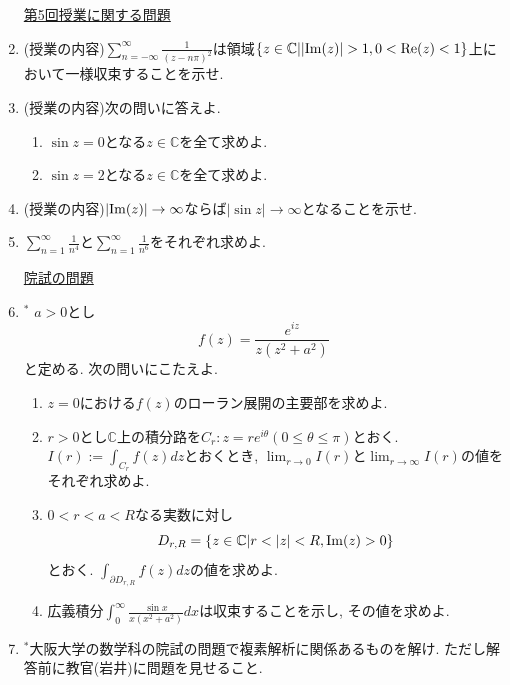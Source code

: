 \documentclass[dvipdfmx,a4paper,11pt]{article}
\newcommand{\C}{\mathbb{C}}
\theoremstyle{definition}
\begin{document}
\begin{enumerate}[label=\textbf{問}4.\arabic*]
      
 \vspace{12pt}
\hspace{-36pt}\underline{第5回授業に関する問題}     
  \item (授業の内容)$\sum_{n= - \infty}^{\infty} \frac{1}{(z - n \pi)^2}$は領域$\{ z \in \C | |{\rm Im}(z)| >1, 0 < {\rm Re}(z) < 1\}$上において一様収束することを示せ.

 \item  (授業の内容)次の問いに答えよ.
  \begin{enumerate}
\setlength{\parskip}{0cm} 
  \setlength{\itemsep}{0cm} 
\item $\sin z =0$となる$z \in \C$を全て求めよ. 
\item $\sin z =2$となる$z \in \C$を全て求めよ. 
   \end{enumerate}
   
 \item  (授業の内容)$|{ \rm Im}(z)| \rightarrow \infty$ならば$|\sin z| \rightarrow \infty$となることを示せ.
 
 
\item $\sum_{n=1}^{\infty}\frac{1}{n^4}$と$\sum_{n=1}^{\infty}\frac{1}{n^6}$をそれぞれ求めよ. 

   
 
\vspace{12pt}
\hspace{-36pt}\underline{院試の問題}  
  \item $^{*}$ $a>0$とし
  $$
  f(z) = \frac{ e^{iz}}{z(z^2 + a^2)}
  $$
  と定める. 次の問いにこたえよ.
   \begin{enumerate}
 \setlength{\parskip}{0cm} 
  \setlength{\itemsep}{0cm} 
  \item $z=0$における$f(z)$のローラン展開の主要部を求めよ.
  \item $r>0$とし$\C$上の積分路を$C_{r} : z = r e^{i \theta} (0 \le \theta \le \pi)$とおく. 
  $I(r) := \int_{C_r} f(z )dz$とおくとき, $\lim_{r \rightarrow 0} I(r)$と$\lim_{r \rightarrow \infty} I(r)$の値をそれぞれ求めよ.
  \item $0 < r < a < R$なる実数に対し
  $$
  D_{r,R}= \{ z \in \C | r < |z| < R, {\rm Im}(z) >0 \}
  $$
  とおく. $\int_{\partial D_{r,R}} f(z) dz$の値を求めよ.
  \item 広義積分$\int_{0}^{\infty}\frac{ \sin x}{x(x^2 + a^2)} dx$は収束することを示し, その値を求めよ.
      \end{enumerate}
     
\item $^{*}$大阪大学の数学科の院試の問題で複素解析に関係あるものを解け. ただし解答前に教官(岩井)に問題を見せること. 

    \end{enumerate}      
 \newpage
 
\end{document}

